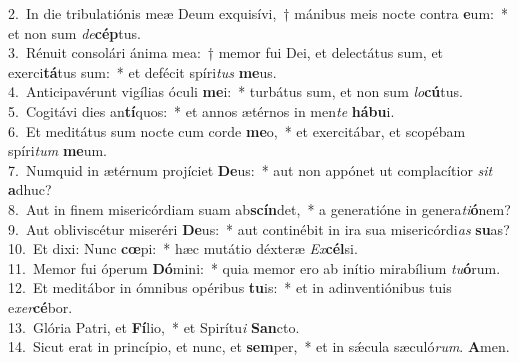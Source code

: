 {2.~}In die tribulatiónis meæ Deum exquisívi,~† mánibus meis nocte contra \textbf{e}um:~* et non sum \textit{de}\textbf{cép}tus.\\
{3.~}Rénuit consolári ánima mea:~† memor fui Dei, et delectátus sum, et exerci\textbf{tá}tus sum:~* et defécit spíri\textit{tus} \textbf{me}us.\\
{4.~}Anticipavérunt vigílias óculi \textbf{me}i:~* turbátus sum, et non sum \textit{lo}\textbf{cú}tus.\\
{5.~}Cogitávi dies an\textbf{tí}quos:~* et annos ætérnos in men\textit{te} \textbf{há}\textbf{bu}i.\\
{6.~}Et meditátus sum nocte cum corde \textbf{me}o,~* et exercitábar, et scopébam spíri\textit{tum} \textbf{me}um.\\
{7.~}Numquid in ætérnum projíciet \textbf{De}us:~* aut non appónet ut complacítior \textit{sit} \textbf{a}dhuc?\\
{8.~}Aut in finem misericórdiam suam ab\textbf{scín}det,~* a generatióne in genera\textit{ti}\textbf{ó}nem?\\
{9.~}Aut obliviscétur miseréri \textbf{De}us:~* aut continébit in ira sua misericórdi\textit{as} \textbf{su}as?\\
{10.~}Et dixi: Nunc \textbf{cœ}pi:~* hæc mutátio déxteræ \textit{Ex}\textbf{cél}si.\\
{11.~}Memor fui óperum \textbf{Dó}mini:~* quia memor ero ab inítio mirabílium \textit{tu}\textbf{ó}rum.\\
{12.~}Et meditábor in ómnibus opéribus \textbf{tu}is:~* et in adinventiónibus tuis e\textit{xer}\textbf{cé}bor.\\
{13.~}Glória Patri, et \textbf{Fí}lio,~* et Spirítu\textit{i} \textbf{San}cto.\\
{14.~}Sicut erat in princípio, et nunc, et \textbf{sem}per,~* et in sǽcula sæculó\textit{rum}. \textbf{A}men.\\
